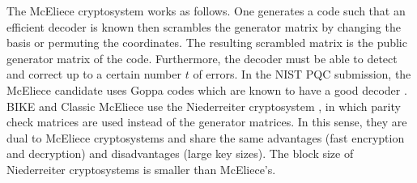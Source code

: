 The McEliece cryptosystem works as follows. One generates a code such that an efficient decoder is known then scrambles the generator matrix by changing the basis or permuting the coordinates. The resulting scrambled matrix is the public generator matrix of the code. Furthermore, the decoder must be able to detect and correct up to a certain number $t$ of errors. In the NIST PQC submission, the McEliece candidate uses Goppa codes which are known to have a good decoder \cite{mceliece,nistmceliece,mceliecedecoder}. BIKE and Classic McEliece use the Niederreiter cryptosystem \cite{niederreiter}, in which parity check matrices are used instead of the generator matrices. In this sense, they are dual to McEliece cryptosystems and share the same advantages (fast encryption and decryption) and disadvantages (large key sizes). The block size of Niederreiter cryptosystems is smaller than McEliece's.